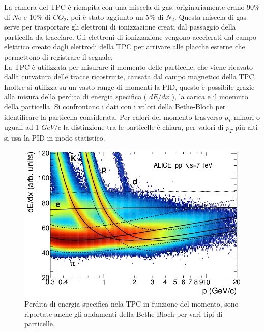     La camera del TPC è riempita con una miscela di gas, originariamente erano 90$\%$ di $Ne$ e 10$\%$ di $CO_2$, poi è stato aggiunto un 5$\%$ di $N_2$. Questa miscela di gas serve per trasportare gli elettroni di ionizzazione creati dal passaggio della particella da tracciare. Gli elettroni di ionizzazione vengono accelerati dal campo elettrico creato dagli elettrodi della TPC per arrivare alle placche esterne che permettono di registrare il segnale. \cite{Collaboration_2008_ALICE}
    \\La TPC è utilizzata per misurare il momento delle particelle, che viene ricavato dalla curvatura delle tracce ricostruite, causata dal campo magnetico della TPC. Inoltre si utilizza su un vasto range di momenti la PID, questo è possibile grazie alla misura della perdita di energia specifica ( $dE/dx$ ), la carica e il moemnto della particella. Si confrontano i dati con i valori della Bethe-Bloch per identificare la particella considerata. Per calori del momento trasverso $p_T$ minori o uguali ad 1 $GeV/c$  la distinzione tra le particelle è chiara, per valori di $p_T$ più alti si usa la PID in modo statistico. 
    
    \begin{figure}[htbp]
        \centering
        \includegraphics[width=0.6\linewidth]{ALICE/Specific-energy-loss-in-the-TPC.png}
        \caption{ Perdita di energia specifica nela TPC in funzione del momento, sono riportate anche gli andamenti della Bethe-Bloch per vari tipi di particelle.}
        \label{fig:BBnellaTPC}
    \end{figure}
    
    
    
    
    
    